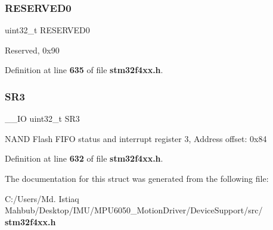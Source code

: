 \mbox{\label{structFSMC__Bank3__TypeDef_af86c61a5d38a4fc9cef942a12744486b}} 
\subsubsection{R\+E\+S\+E\+R\+V\+E\+D0}
{\footnotesize\ttfamily uint32\+\_\+t R\+E\+S\+E\+R\+V\+E\+D0}

Reserved, 0x90 

Definition at line \textbf{ 635} of file \textbf{ stm32f4xx.\+h}.

\mbox{\label{structFSMC__Bank3__TypeDef_af30c34f7c606cb9416a413ec5fa36491}} 
\subsubsection{S\+R3}
{\footnotesize\ttfamily \+\_\+\+\_\+\+IO uint32\+\_\+t S\+R3}

N\+A\+ND Flash F\+I\+FO status and interrupt register 3, Address offset\+: 0x84 

Definition at line \textbf{ 632} of file \textbf{ stm32f4xx.\+h}.



The documentation for this struct was generated from the following file\+:\begin{DoxyCompactItemize}
\item 
C\+:/\+Users/\+Md. Istiaq Mahbub/\+Desktop/\+I\+M\+U/\+M\+P\+U6050\+\_\+\+Motion\+Driver/\+Device\+Support/src/\textbf{ stm32f4xx.\+h}\end{DoxyCompactItemize}
